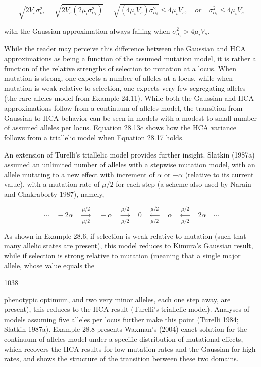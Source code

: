 \documentclass{article}
\begin{document}
\begin{equation}
\sqrt{2V_{s}\sigma_{m}^{2}}=\sqrt{2V_{s}\left(2\mu_{i}\sigma_{\alpha_{i}}^{2}\right)}=\sqrt{\left(4\mu_{i}V_{s}\right)\sigma_{\alpha_{i}}^{2}}\leq4\mu_{i}V_{s},\quad or\quad\sigma_{\alpha_{i}}^{2}\leq4\mu_{i}V_{s}
\tag{28.18e}
\label{eq:28_18e}
\end{equation}

with the Gaussian approximation always failing when  $ \sigma_{\alpha_i}^2 > 4\mu_i V_s $.

While the reader may perceive this difference between the Gaussian and HCA approximations as being a function of the assumed mutation model, it is rather a function of the relative strengths of selection to mutation at a locus. When mutation is strong, one expects a number of alleles at a locus, while when mutation is weak relative to selection, one expects very few segregating alleles (the rare-alleles model from Example 24.11). While both the Gaussian and HCA approximations follow from a continuum-of-alleles model, the transition from Gaussian to HCA behavior can be seen in models with a modest to small number of assumed alleles per locus. Equation 28.13c shows how the HCA variance follows from a triallelic model when Equation 28.17 holds.

An extension of Turelli's triallelic model provides further insight. Slatkin (1987a) assumed an unlimited number of alleles with a stepwise mutation model, with an allele mutating to a new effect with increment of  $ \alpha $ or  $ -\alpha $ (relative to its current value), with a mutation rate of  $ \mu/2 $ for each step (a scheme also used by Narain and Chakraborty 1987), namely,

\begin{equation}
\cdots\quad-2\alpha\quad\xrightarrow[\mu/2]{\mu/2}\quad-\alpha\quad\xrightarrow[\mu/2]{\mu/2}\quad0\quad\xleftarrow[\mu/2]{\mu/2}\quad\alpha\quad\xleftarrow[\mu/2]{\mu/2}\quad2\alpha\quad\cdots
\end{equation}

As shown in Example 28.6, if selection is weak relative to mutation (such that many allelic states are present), this model reduces to Kimura's Gaussian result, while if selection is strong relative to mutation (meaning that a single major allele, whose value equals the

1038

phenotypic optimum, and two very minor alleles, each one step away, are present), this reduces to the HCA result (Turelli's triallelic model). Analyses of models assuming five alleles per locus further make this point (Turelli 1984; Slatkin 1987a). Example 28.8 presents Waxman's (2004) exact solution for the continuum-of-alleles model under a specific distribution of mutational effects, which recovers the HCA results for low mutation rates and the Gaussian for high rates, and shows the structure of the transition between these two domains.
\end{document}

